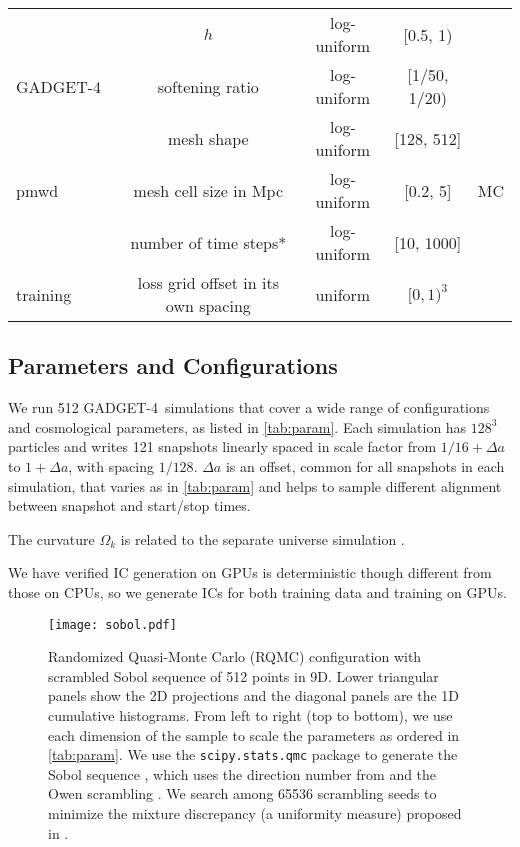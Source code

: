\documentclass[usenatbib]{mnras}
\newcommand{\pmwd}{{\usefont{T1}{nova}{m}{sl}pmwd}}
\newcommand{\GADGET}{{{\fontsize{7.7pt}{9pt}\selectfont GADGET}-4}}
\begin{document}
\begin{table*}
\begin{tabular}{lcccr}
\cmidrule(lr){2-4}
& $h$ & log-uniform & [0.5, 1) \\
\cmidrule(lr){1-4}
\GADGET\ & softening ratio & log-uniform & [1/50, 1/20) \\
\cmidrule(lr){1-5}
& mesh shape & log-uniform & [128, 512] \\
\cmidrule(lr){2-4}
\pmwd\ & mesh cell size in Mpc & log-uniform & [0.2, 5] & MC \\
\cmidrule(lr){2-4}
& number of time steps* & log-uniform & [10, 1000] \\
\cmidrule(lr){1-4}
training & loss grid offset in its own spacing & uniform & $[0, 1)^3$ \\
\bottomrule
\end{tabular}
\end{table*}


\subsection{Parameters and Configurations}

We run 512 \GADGET\ simulations that cover a wide range of
configurations and cosmological parameters, as listed in
\autoref{tab:param}.
Each simulation has $128^3$ particles and writes 121 snapshots linearly
spaced in scale factor from $1/16 + \Delta a$ to $1 + \Delta a$, with
spacing $1/128$.
$\Delta a$ is an offset, common for all snapshots in each simulation,
that varies as in \autoref{tab:param} and helps to sample different
alignment between snapshot and start/stop times.

The curvature $\Omega_k$ is related to the separate universe simulation
\citep{LiEtAl2014, WagnerEtAl2015}.

We have verified IC generation on GPUs is deterministic though different
from those on CPUs, so we generate ICs for both training data and
training on GPUs.


\begin{figure*}
  \centering
  \texttt{[image: sobol.pdf]}
  \caption{Randomized Quasi-Monte Carlo (RQMC) configuration with
    scrambled Sobol sequence of 512 points in 9D.
    Lower triangular panels show the 2D projections and the diagonal
    panels are the 1D cumulative histograms.
    From left to right (top to bottom), we use each dimension of the
    sample to scale the parameters as ordered in \autoref{tab:param}.
    We use the \texttt{scipy.stats.qmc} package \citep{SciPy} to
    generate the Sobol sequence \citep{Sobol1967}, which uses the
    direction number from \citet{JoeKuo2008} and the Owen scrambling
    \citep{Owen1998}.
    We search among 65536 scrambling seeds to minimize the mixture
    discrepancy (a uniformity measure) proposed in \citet{Zhou2013MD}.
  }
  \label{fig:sobol}
\end{figure*}
\end{document}
